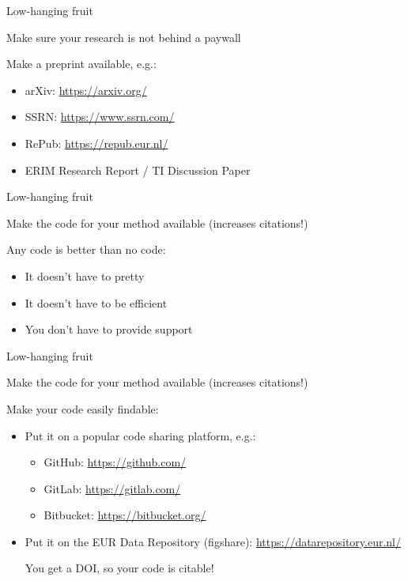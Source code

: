 \documentclass[pdfpagelabels=false, usepdftitle=false]{beamer}
\begin{document}
\begin{frame}[t]{Low-hanging fruit}
\begin{itemize}
  \arrowitem \alert{Make sure your research is not behind a paywall}
\end{itemize}

\vfill

Make a preprint available, e.g.:
\medskip
\begin{itemize}
  \item arXiv: \url{https://arxiv.org/}
  \smallskip
  \item SSRN: \url{https://www.ssrn.com/}
  \smallskip
  \item RePub: \url{https://repub.eur.nl/}
  \smallskip
  \item ERIM Research Report / TI Discussion Paper
\end{itemize}
\end{frame}


\begin{frame}[t]{Low-hanging fruit}
\begin{itemize}
  \arrowitem \alert{Make the code for your method available}
  (increases citations!)
\end{itemize}

\vfill

Any code is better than no code:
\medskip
\begin{itemize}
  \item It doesn't have to pretty
  \smallskip
  \item It doesn't have to be efficient
  \smallskip
  \item You don't have to provide support
\end{itemize}
\end{frame}


\begin{frame}[t]{Low-hanging fruit}
\begin{itemize}
  \arrowitem \alert{Make the code for your method available}
  (increases citations!)
\end{itemize}

\vfill

Make your code easily findable:
\medskip
\begin{itemize}
  \item Put it on a popular code sharing platform, e.g.:
  \begin{itemize}
    \item GitHub: \url{https://github.com/}
    \item GitLab: \url{https://gitlab.com/}
    \item Bitbucket: \url{https://bitbucket.org/}
  \end{itemize}
  \smallskip
  \smallskip
  \item Put it on the EUR Data Repository (figshare):
  \url{https://datarepository.eur.nl/}
  \begin{itemize}
    \arrowitem You get a DOI, so your code is citable!
  \end{itemize}
\end{itemize}
\end{frame}
\end{document}
